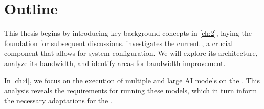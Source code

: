 \section{Outline}

This thesis begins by introducing key background concepts in \cref{ch:2}, laying the foundation for subsequent discussions.
 investigates the current \confignoc{}, a crucial component that allows for system configuration.
We will explore its architecture, analyze its bandwidth, and identify areas for bandwidth improvement.

In \cref{ch:4}, we focus on the execution of multiple and large AI models on the \graicore{}.
This analysis reveals the requirements for running these models, which in turn inform the necessary adaptations for the \confignoc{}.


